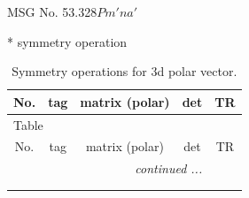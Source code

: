 \documentclass[fleqn,8pt]{jsarticle}
\begin{document}
\setcounter{MaxMatrixCols}{32}

\renewcommand{\tablename}{Table~}
\renewcommand{\figurename}{Figure~}
\begin{center}
\LARGE
MSG No. 53.328\quad$Pm'na'$
\end{center}
* symmetry operation
\renewcommand{\arraystretch}{1.3}
\begin{longtable}{ccccc}
\caption{Symmetry operations for 3d polar vector.}
 \\
 \hline \hline
No. & tag & matrix (polar) & det & TR \\ \hline \endfirsthead

\multicolumn{4}{l}{\tablename\ \thetable{}} \\
 \hline \hline
No. & tag & matrix (polar) & det & TR \\ \hline \endhead

 \hline \hline
\multicolumn{4}{r}{\footnotesize\it continued ...} \\ \endfoot

 \hline \hline
\multicolumn{4}{r}{} \\ \endlastfoot


\end{longtable}
\end{document}

